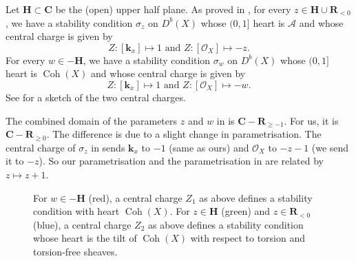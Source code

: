 \documentclass{amsart}
\begin{document}
Let \(\mathbf{H} \subset \mathbf{C}\) be the (open) upper half plane.
As proved in \cite[\S~4.2]{huy.mac.ste:08}, for every \(z \in \mathbf{H} \cup \mathbf{R}_{<0}\), we have a stability condition \(\sigma_{z}\) on \(D^b(X)\) whose \((0,1]\) heart is \(\mathcal{A}\) and whose central charge is given by
\[ Z \colon [\mathbf{k}_x] \mapsto 1 \text{ and } Z \colon [\mathcal{O}_X] \mapsto -z.\]
For every \(w \in -\mathbf{H}\), we have a stability condition \(\sigma_{w}\) on \(D^b(X)\) whose \((0,1]\) heart is \(\operatorname{Coh}(X)\) and whose central charge is given by
\[ Z \colon [\mathbf{k}_x] \mapsto 1 \text{ and } Z \colon [\mathcal{O}_X] \mapsto -w.\]
See  for a sketch of the two central charges.
\begin{remark}
  The combined domain of the parameters \(z\) and \(w\) in \cite[\S~4.2]{huy.mac.ste:08} is \(\mathbf{C} - \mathbf{R}_{\geq -1}\).
  For us, it is \(\mathbf{C} - \mathbf{R}_{\geq 0}\).
  The difference is due to a slight change in parametrisation.
  The central charge of \(\sigma_z\) in \cite[\S~4.2]{huy.mac.ste:08} sends \(\mathbf{k}_x\) to \(-1\) (same as ours)  and \(\mathcal{O}_X\) to \(-z-1\) (we send it to \(-z\)).
  So our parametrisation and the parametrisation in \cite[\S~4.2]{huy.mac.ste:08} are related by \(z \mapsto z+1\).
\end{remark}
\begin{figure}[ht]
  \centering
  \caption{For \(w \in -\mathbf{H}\) (red), a central charge \(Z_1\) as above defines a stability condition with heart \(\operatorname{Coh}(X)\). For \(z \in \mathbf{H}\) (green) and \(z \in \mathbf{R}_{<0}\) (blue), a central charge \(Z_2\) as above defines a stability condition whose heart is the tilt of \(\operatorname{Coh}(X)\) with respect to torsion and torsion-free sheaves.}
  \label{fig:standardstability}
\end{figure}
\end{document}
